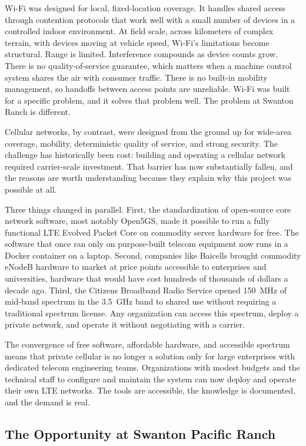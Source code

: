 \documentclass[
    left=1.5in,
    right=1.25in,
    top=1.25in,
    bottom=1.25in
]{CalPolySeniorProject}
\begin{document}
Wi-Fi was designed for local, fixed-location coverage. It handles shared access
through contention protocols that work well with a small number of devices in a
controlled indoor environment. At field scale, across kilometers of complex
terrain, with devices moving at vehicle speed, Wi-Fi's limitations become
structural. Range is limited. Interference compounds as device counts grow.
There is no quality-of-service guarantee, which matters when a machine control
system shares the air with consumer traffic. There is no built-in mobility
management, so handoffs between access points are unreliable. Wi-Fi was built
for a specific problem, and it solves that problem well. The problem at Swanton
Ranch is different.

Cellular networks, by contrast, were designed from the ground up for wide-area
coverage, mobility, deterministic quality of service, and strong security. The
challenge has historically been cost: building and operating a cellular network
required carrier-scale investment. That barrier has now substantially fallen,
and the reasons are worth understanding because they explain why this project
was possible at all.

Three things changed in parallel. First, the standardization of open-source
core network software, most notably Open5GS, made it possible to run a fully
functional LTE Evolved Packet Core on commodity server hardware for free. The
software that once ran only on purpose-built telecom equipment now runs in a
Docker container on a laptop. Second, companies like Baicells brought commodity
eNodeB hardware to market at price points accessible to enterprises and
universities, hardware that would have cost hundreds of thousands of dollars a
decade ago. Third, the Citizens Broadband Radio Service opened 150~MHz of
mid-band spectrum in the 3.5~GHz band to shared use without requiring a
traditional spectrum license. Any organization can access this spectrum, deploy
a private network, and operate it without negotiating with a carrier.

The convergence of free software, affordable hardware, and accessible spectrum
means that private cellular is no longer a solution only for large enterprises
with dedicated telecom engineering teams. Organizations with modest budgets and
the technical staff to configure and maintain the system can now deploy and
operate their own LTE networks. The tools are accessible, the knowledge is
documented, and the demand is real.

\subsection{The Opportunity at Swanton Pacific Ranch}
\end{document}

